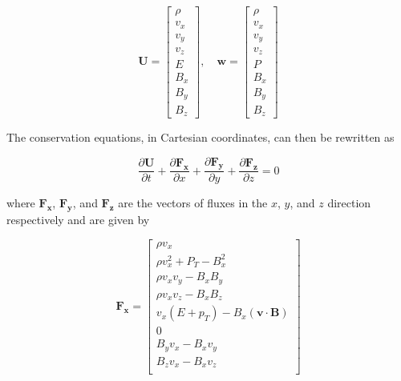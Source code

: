 \begin{equation}
    \boldsymbol{U} = \begin{bmatrix}
            \rho \\
            v_x \\
            v_y \\
            v_z \\
            E   \\
            B_x \\
            B_y \\
            B_z
         \end{bmatrix}, \quad
    \boldsymbol{w} = \begin{bmatrix}
            \rho \\
            v_x \\
            v_y \\
            v_z \\
            P   \\
            B_x \\
            B_y \\
            B_z 
         \end{bmatrix}
\end{equation}


The conservation equations, in Cartesian coordinates, can then be rewritten as

\begin{equation}
    \label{eqn:vector-conserved}
    \frac{\partial \boldsymbol{U}}{\partial t} + 
    \frac{\partial \boldsymbol{F_x}}{\partial x} + 
    \frac{\partial \boldsymbol{F_y}}{\partial y} + 
    \frac{\partial \boldsymbol{F_z}}{\partial z} = 0 
\end{equation}

where $\boldsymbol{F_x}$, $\boldsymbol{F_y}$, and $\boldsymbol{F_z}$ are the vectors of fluxes in the $x$, $y$, and $z$ direction respectively and are given by

\begin{equation}
    \boldsymbol{F_x} = \begin{bmatrix}
            \rho v_{x} \\
            \rho v_{x}^2 + P_{T} - B_{x}^2 \\
            \rho v_{x} v_{y} - B_{x} B_{y} \\
            \rho v_{x} v_{z} - B_{x} B_{z} \\
            v_{x} \left( E + p_{T} \right) - B_{x} \left( \boldsymbol{v} \cdot \boldsymbol{B} \right) \\
            0 \\
            B_{y} v_{x} - B_{x} v_{y} \\
            B_{z} v_{x} - B_{x} v_{z} \\
         \end{bmatrix}
\end{equation}

